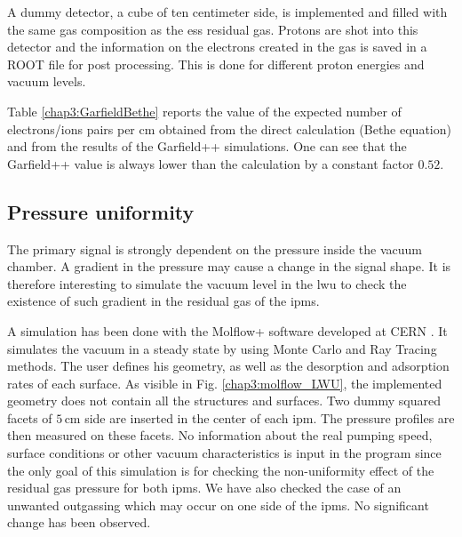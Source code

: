\begin{refsection}
  
  A dummy detector, a cube of ten centimeter side, is implemented and filled with the same gas composition as the \acrshort{ess} residual gas. Protons are shot into this detector and the information on the electrons created in the gas is saved in a ROOT file \cite{Brun1997,Antcheva2009} for post processing. This is done for different proton energies and vacuum levels.

  Table \ref{chap3:GarfieldBethe} reports the value of the expected number of electrons/ions pairs per cm obtained from the direct calculation (Bethe equation) and from the results of the Garfield++ simulations. One can see that the Garfield++ value is always lower than the calculation by a constant factor $0.52$.


  \subsection{Pressure uniformity}

  The primary signal is strongly dependent on the pressure inside the vacuum chamber. A gradient in the pressure may cause a change in the signal shape. It is therefore interesting to simulate the vacuum level in the \acrshort{lwu} to check the existence of such gradient in the residual gas of the \acrshort{ipm}s.

  

  A simulation has been done with the Molflow+ software developed at CERN \cite{Kersevan2009}. It simulates the vacuum in a steady state by using Monte Carlo and Ray Tracing methods. The user defines his geometry, as well as the desorption and adsorption rates of each surface. As visible in Fig. \ref{chap3:molflow_LWU}, the implemented geometry does not contain all the structures and surfaces. Two dummy squared facets of $5\,\mathrm{cm}$ side are inserted in the center of each \acrshort{ipm}. The pressure profiles are then measured on these facets. No information about the real pumping speed, surface conditions or other vacuum characteristics is input in the program since the only goal of this simulation is for checking the non-uniformity effect of the residual gas pressure for both \acrshort{ipm}s. We have also checked the case of an unwanted outgassing which may occur on one side of the \acrshort{ipm}s. No significant change has been observed.

  


\end{refsection}
